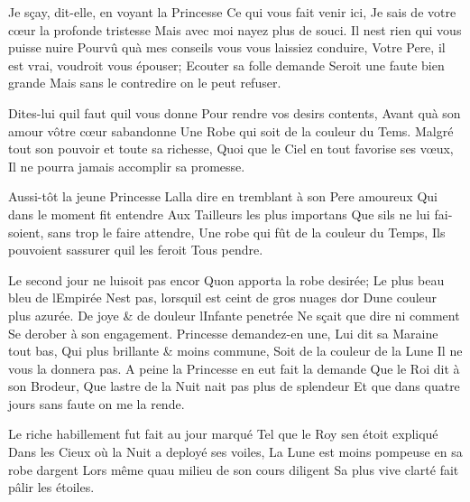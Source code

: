\documentclass[14pt,a4paper]{memoir}
\begin{document}
\begin{otherlanguage}{french}
{Je sçay, dit-elle, en voyant la Princesse} {Ce qui vous fait venir
ici,} {Je sais de votre cœur la profonde tristesse } {Mais avec moi
n\textquotesingle ayez plus de souci.} {Il n\textquotesingle est rien
qui vous puisse nuire} {Pourvû qu\textquotesingle à mes conseils vous
vous laissiez conduire,} {Votre Pere, il est vrai, voudroit vous
épouser; } {Ecouter sa folle demande} {Seroit une faute bien grande}
{Mais sans le contredire on le peut refuser.}

{Dites-lui qu\textquotesingle il faut qu\textquotesingle il vous donne}
{Pour rendre vos desirs contents,} {Avant qu\textquotesingle à son amour
vôtre cœur s\textquotesingle abandonne } {Une Robe qui soit de la
couleur du Tems.} {Malgré tout son pouvoir et toute sa richesse,} {Quoi
que le Ciel en tout favorise ses vœux, } {Il ne pourra jamais accomplir
sa promesse.}

{Aussi-tôt la jeune Princesse} {L\textquotesingle alla dire en tremblant
à son Pere amoureux} {Qui dans le moment fit entendre} {Aux Tailleurs
les plus importans} {Que s\textquotesingle ils ne lui faisoient, sans
trop le faire attendre,} {Une robe qui fût de la couleur du Temps,} {Ils
pouvoient s\textquotesingle assurer qu\textquotesingle il les feroit}
{Tous pendre.}

{Le second jour ne luisoit pas encor} {Qu\textquotesingle on apporta la
robe desirée;} {Le plus beau bleu de l\textquotesingle Empirée}
{N\textquotesingle est pas, lorsqu\textquotesingle il est ceint de gros
nuages d\textquotesingle or} {D\textquotesingle une couleur plus
azurée.} {De joye \& de douleur l\textquotesingle Infante penetrée} {Ne
sçait que dire ni comment} {Se derober à son engagement.} {Princesse
demandez-en une,} {Lui dit sa Maraine tout bas,} {Qui plus brillante \&
moins commune,} {Soit de la couleur de la Lune} {Il ne vous la donnera
pas.} {A peine la Princesse en eut fait la demande} {Que le Roi dit à
son Brodeur,} {Que l\textquotesingle astre de la Nuit
n\textquotesingle ait pas plus de splendeur} {Et que dans quatre jours
sans faute on me la rende.}

{Le riche habillement fut fait au jour marqué} {Tel que le Roy
s\textquotesingle en étoit expliqué} {Dans les Cieux où la Nuit a
deployé ses voiles, } {La Lune est moins pompeuse en sa robe
d\textquotesingle argent} {Lors même qu\textquotesingle au milieu de son
cours diligent} {Sa plus vive clarté fait pâlir les étoiles.}


\end{otherlanguage}
\end{document}
